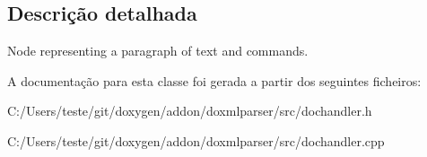 \subsection{Descrição detalhada}
Node representing a paragraph of text and commands. 



A documentação para esta classe foi gerada a partir dos seguintes ficheiros\-:\begin{DoxyCompactItemize}
\item 
C\-:/\-Users/teste/git/doxygen/addon/doxmlparser/src/dochandler.\-h\item 
C\-:/\-Users/teste/git/doxygen/addon/doxmlparser/src/dochandler.\-cpp\end{DoxyCompactItemize}
